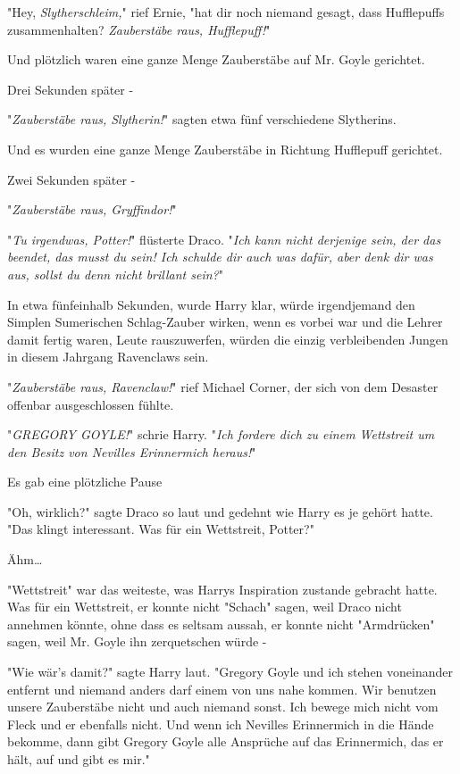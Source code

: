{"Hey, \emph{Slytherschleim,}" rief Ernie, "hat dir noch niemand gesagt, dass Hufflepuffs zusammenhalten? \emph{Zauberstäbe raus, Hufflepuff!}"

Und plötzlich waren eine ganze Menge Zauberstäbe auf Mr. Goyle gerichtet.

Drei Sekunden später -

"\emph{Zauberstäbe raus, Slytherin!}" sagten etwa fünf verschiedene Slytherins.

Und es wurden eine ganze Menge Zauberstäbe in Richtung Hufflepuff gerichtet.

Zwei Sekunden später -

"\emph{Zauberstäbe raus, Gryffindor!}"

"\emph{Tu irgendwas, Potter!}" flüsterte Draco. "\emph{Ich kann nicht derjenige sein, der das beendet, das musst du sein! Ich schulde dir auch was dafür, aber denk dir was aus, sollst du denn nicht brillant sein?}"

In etwa fünfeinhalb Sekunden, wurde Harry klar, würde irgendjemand den Simplen Sumerischen Schlag-Zauber wirken, wenn es vorbei war und die Lehrer damit fertig waren, Leute rauszuwerfen, würden die einzig verbleibenden Jungen in diesem Jahrgang Ravenclaws sein.

"\emph{Zauberstäbe raus, Ravenclaw!}" rief Michael Corner, der sich von dem Desaster offenbar ausgeschlossen fühlte.

"\emph{GREGORY GOYLE!}" schrie Harry. "\emph{Ich fordere dich zu einem Wettstreit um den Besitz von Nevilles Erinnermich heraus!}"

Es gab eine plötzliche Pause

"Oh, wirklich?" sagte Draco so laut und gedehnt wie Harry es je gehört hatte. "Das klingt interessant. Was für ein Wettstreit, Potter?"

Ähm…

"Wettstreit" war das weiteste, was Harrys Inspiration zustande gebracht hatte. Was für ein Wettstreit, er konnte nicht "Schach" sagen, weil Draco nicht annehmen könnte, ohne dass es seltsam aussah, er konnte nicht "Armdrücken" sagen, weil Mr. Goyle ihn zerquetschen würde -

"Wie wär's damit?" sagte Harry laut. "Gregory Goyle und ich stehen voneinander entfernt und niemand anders darf einem von uns nahe kommen. Wir benutzen unsere Zauberstäbe nicht und auch niemand sonst. Ich bewege mich nicht vom Fleck und er ebenfalls nicht. Und wenn ich Nevilles Erinnermich in die Hände bekomme, dann gibt Gregory Goyle alle Ansprüche auf das Erinnermich, das er hält, auf und gibt es mir."

}
